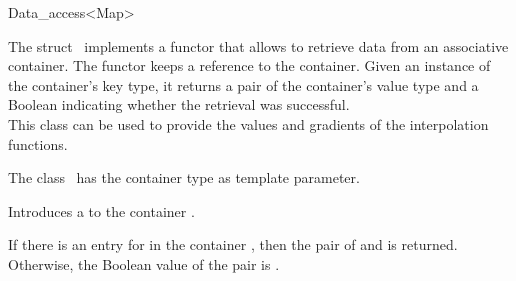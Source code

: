 \begin{ccRefClass}{Data_access<Map>}  %

\ccDefinition
  
The struct \ccRefName\ implements a functor that allows to retrieve
data from an associative container. The functor keeps a reference to
the container. Given an instance of the container's key type, it
returns a pair of the container's value type and a Boolean indicating
whether the retrieval was successful.\\

This class can be used to provide the values and gradients of the
interpolation functions.


\ccParameters The class
\ccRefName\ has the container type  as template parameter.

\ccTypes 
{}
\ccGlue
{}
\ccCreation
{}  %
{Introduces a  to the container .}


 {If
  there is an entry for  in the container , then the
  pair of  and  is returned. Otherwise, the
  Boolean value of the pair is .}

\end{ccRefClass}
